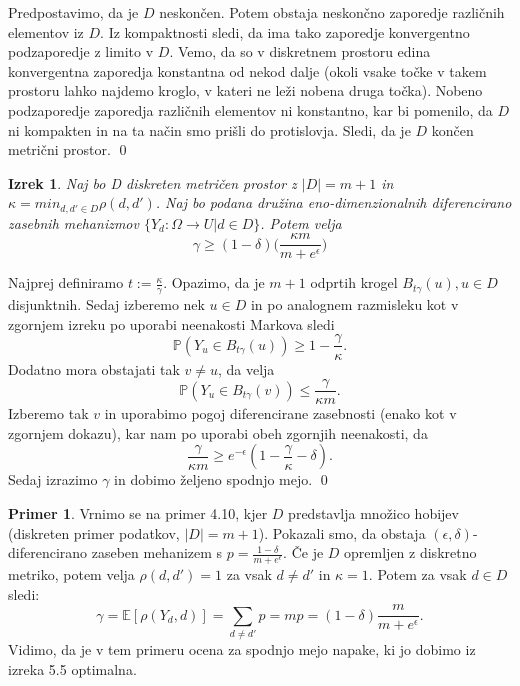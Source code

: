 \documentclass[12pt,a4paper]{amsart}
\theoremstyle{definition} %
\newtheorem{primer}[definicija]{Primer}
\theoremstyle{plain} %
\newtheorem{izrek}[definicija]{Izrek}
\begin{document}
\proof
 Predpostavimo, da je $D$ neskončen. Potem obstaja neskončno zaporedje različnih elementov iz $D$. Iz kompaktnosti sledi, da ima tako zaporedje konvergentno podzaporedje z limito v $D$. Vemo, da so v diskretnem prostoru edina konvergentna zaporedja konstantna od nekod dalje (okoli vsake točke v takem prostoru lahko najdemo kroglo, v kateri ne leži nobena druga točka). Nobeno podzaporedje zaporedja različnih elementov ni konstantno, kar bi pomenilo, da $D$ ni kompakten in na ta način smo prišli do protislovja. Sledi, da je $D$ končen metrični prostor.
\qed
\newline
\newline
\begin{izrek}
Naj bo D diskreten metričen prostor z $|D| = m + 1$ in $\kappa = min_{d,d' \in D}\rho(d,d')$.  Naj bo podana družina eno-dimenzionalnih diferencirano zasebnih mehanizmov $\{ Y_d: \Omega \rightarrow U | d \in D\}$. Potem velja $$\gamma  \geq (1-\delta)\Big(\frac{\kappa m}{m+e^\epsilon}\Big)$$
\end{izrek}
\proof
Najprej definiramo $t := \frac{\kappa}{\gamma}$. Opazimo, da je $m + 1$ odprtih krogel $B_{t\gamma}(u), u \in D$ disjunktnih. Sedaj izberemo nek $u \in D$ in po analognem razmisleku kot v zgornjem izreku po uporabi neenakosti Markova sledi $$\mathbb{P}(Y_u \in B_{t\gamma}(u)) \geq 1 - \frac{\gamma}{\kappa}.$$
Dodatno mora obstajati tak $v \neq u$, da velja $$\mathbb{P}(Y_u \in B_{t\gamma}(v)) \leq \frac{\gamma}{\kappa m}.$$  Izberemo tak $v$ in uporabimo pogoj diferencirane zasebnosti (enako kot v zgornjem dokazu), kar nam po uporabi obeh zgornjih neenakosti, da $$\frac{\gamma}{\kappa m} \geq e^{-\epsilon}(1 - \frac{\gamma}{\kappa} - \delta). $$ Sedaj izrazimo $\gamma$ in dobimo željeno spodnjo mejo.
\qed
\begin{primer}
Vrnimo se na primer 4.10, kjer $D$ predstavlja množico hobijev (diskreten primer podatkov, $|D|=m+1$). Pokazali smo, da obstaja $(\epsilon, \delta)$-diferencirano zaseben mehanizem s $p=\frac{1-\delta}{m+e^{\epsilon}}$. Če je $D$ opremljen z diskretno metriko, potem velja $\rho(d,d')=1$ za vsak $d \neq d'$ in $\kappa=1$. Potem za vsak $d \in D$ sledi:
$$\gamma = \mathbb{E}[\rho(Y_d,d)] = \sum_{d \neq d'}p=mp=(1-\delta)\frac{m}{m+e^{\epsilon}}.$$ Vidimo, da je v tem primeru ocena za spodnjo mejo napake, ki jo dobimo iz izreka 5.5 optimalna.
\end{primer}
\end{document}
